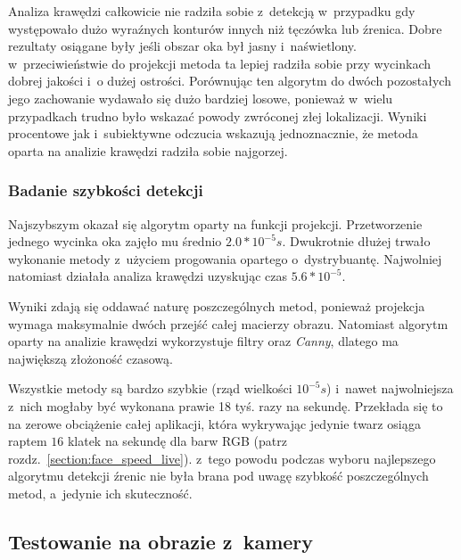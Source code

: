 \par

Analiza krawędzi całkowicie nie radziła sobie z~detekcją w~przypadku gdy występowało dużo wyraźnych konturów innych niż tęczówka lub źrenica. Dobre rezultaty osiągane były jeśli obszar oka był jasny i~naświetlony. w~przeciwieństwie do projekcji metoda ta lepiej radziła sobie przy wycinkach dobrej jakości i~o dużej ostrości. Porównując ten algorytm do dwóch pozostałych jego zachowanie wydawało się dużo bardziej losowe, ponieważ w~wielu przypadkach trudno było wskazać powody zwróconej złej lokalizacji. Wyniki procentowe jak i~subiektywne odczucia wskazują jednoznacznie, że metoda oparta na analizie krawędzi radziła sobie najgorzej.





\subsubsection{Badanie szybkości detekcji} \label{section:test_pupil_speed_img}



Najszybszym okazał się algorytm oparty na funkcji projekcji. Przetworzenie jednego wycinka oka zajęło mu średnio $2.0*10^{-5}s$. Dwukrotnie dłużej trwało wykonanie metody z~użyciem progowania opartego o~dystrybuantę. Najwolniej natomiast działała analiza krawędzi uzyskując czas $5.6*10^{-5}$.

\par

Wyniki zdają się oddawać naturę poszczególnych metod, ponieważ projekcja wymaga maksymalnie dwóch przejść całej macierzy obrazu. Natomiast algorytm oparty na analizie krawędzi wykorzystuje filtry oraz \textit{Canny}, dlatego ma największą złożoność czasową.

\par

Wszystkie metody są bardzo szybkie (rząd wielkości $10^{-5}s$) i~nawet najwolniejsza z~nich mogłaby być wykonana prawie 18 tyś. razy na sekundę. Przekłada się to na zerowe obciążenie całej aplikacji, która wykrywając jedynie twarz osiąga raptem $16$ klatek na sekundę dla barw RGB (patrz rozdz.~\ref{section:face_speed_live}). z~tego powodu podczas wyboru najlepszego algorytmu detekcji źrenic nie była brana pod uwagę szybkość poszczególnych metod, a~jedynie ich skuteczność.




\subsection{Testowanie na obrazie z~kamery}


